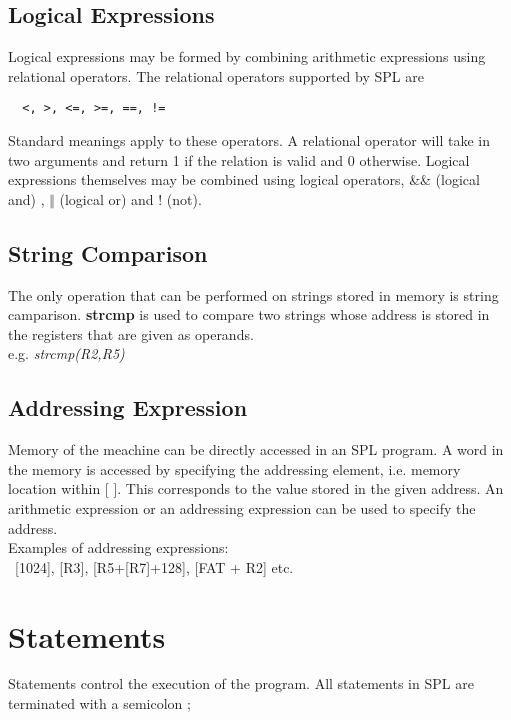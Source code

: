 \documentclass[11pt]{article}
\begin{document}
\subsection{Logical Expressions}

Logical expressions may be formed by combining arithmetic expressions using relational operators. The relational operators supported by SPL are \begin{verbatim}  <, >, <=, >=, ==, !=
\end{verbatim}
Standard  meanings apply to these operators. A relational operator will take in two arguments and return 1 if the relation is valid and 0 otherwise. Logical expressions themselves may be combined using logical operators, \&\& (logical and) ,  $\Vert$ (logical or) and ! (not).

\subsection{String Comparison}
The only operation that can be performed on strings stored in memory is string camparison. \textbf{strcmp} is used to compare two strings whose address is stored in the registers that are given as operands. \\

 e.g. \textit{strcmp(R2,R5)}


\subsection{Addressing Expression}
Memory of the meachine can be directly accessed in an SPL program. A word in the memory is accessed by specifying the addressing element, i.e. memory location within [ ]. This  corresponds to the value stored in the given address. An arithmetic expression or an addressing expression can be used to specify the address. \\

Examples of addressing expressions: \\\   
 [1024], [R3], [R5+[R7]+128], [FAT + R2] etc.

\section{Statements}

Statements control the execution of the program. All statements in SPL are terminated with a semicolon ;
\end{document}
